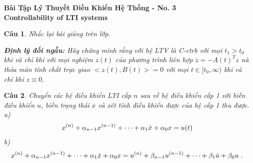 \documentclass[11pt]{article}
\newtheorem{bt}{Câu}
\begin{document}



\begin{center}
	{\bf Bài Tập Lý Thuyết Điều Khiển Hệ Thống - No. 3 \\
	     Controllability of LTI systems}
\end{center}

\begin{bt}
Nhắc lại bài giảng trên lớp.
\begin{tcolorbox}[colback=red!5!white,colframe=green!75!black]
\textbf{Định lý đối ngẫu:} Hãy chứng minh rằng với hệ LTV là C-ctrb với mọi $t_1>t_0$ khi và chỉ khi với mọi nghiệm $z(t)$ của phương trình liên hợp $\dot{z}= - A(t)^Tz$ nà thỏa mãn tính chất trực giao $<z(t),B(t)> = 0$ với mọi $t\in [t_0,\infty)$ khi và chỉ khi $z \equiv 0$.
\end{tcolorbox}
\end{bt}

\begin{bt}
	Chuyển các hệ điều khiển LTI cấp $n$ sau về hệ điều khiển cấp 1 với biến điều khiển $u$, biến trạng thái $x$ và xét tính điều khiển được của hệ cấp 1 thu được. \\
	a) 
	\begin{equation}
		x^{(n)} + \alpha_{n-1} x^{(n-1)} + \dots + \alpha_1 \dot{x} + \alpha_0 x = u(t) 
	\end{equation}
	b) 
	\begin{equation}
		x^{(n)} + \a_{n-1} x^{(n-1)} + \dots + \a_1 \dot{x} + \a_0 x = 
		u^{(n)} + \b_{n-1} u^{(n-1)} + \dots + \b_1 \dot{u} + \b_0 u \ . 
	\end{equation} 
\end{bt}
\end{document}
